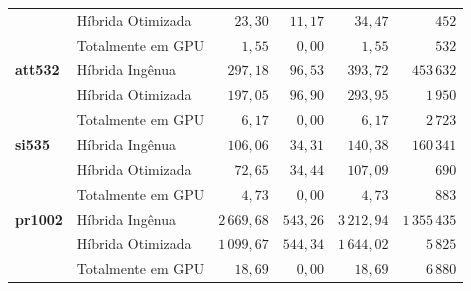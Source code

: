 \begin{table}[htbp]
\begin{tabeladensa}
\begin{tabular}{@{}llrrrr@{}}
                        & Híbrida Otimizada & \(23{,}30\)        & \(11{,}17\)        & \(34{,}47\)     & \(452\)         \\
                        & Totalmente em GPU & \(1{,}55\)         & \(0{,}00\)         & \(1{,}55\)      & \(532\)         \\
      \midrule
      \textbf{att532}   & Híbrida Ingênua   & \(297{,}18\)       & \(96{,}53\)        & \(393{,}72\)    & \(453\,632\)    \\
                        & Híbrida Otimizada & \(197{,}05\)       & \(96{,}90\)        & \(293{,}95\)    & \(1\,950\)      \\
                        & Totalmente em GPU & \(6{,}17\)         & \(0{,}00\)         & \(6{,}17\)      & \(2\,723\)      \\
      \midrule
      \textbf{si535}    & Híbrida Ingênua   & \(106{,}06\)       & \(34{,}31\)        & \(140{,}38\)    & \(160\,341\)    \\
                        & Híbrida Otimizada & \(72{,}65\)        & \(34{,}44\)        & \(107{,}09\)    & \(690\)         \\
                        & Totalmente em GPU & \(4{,}73\)         & \(0{,}00\)         & \(4{,}73\)      & \(883\)         \\
      \midrule
      \textbf{pr1002}   & Híbrida Ingênua   & \(2\,669{,}68\)    & \(543{,}26\)       & \(3\,212{,}94\) & \(1\,355\,435\) \\
                        & Híbrida Otimizada & \(1\,099{,}67\)    & \(544{,}34\)       & \(1\,644{,}02\) & \(5\,825\)      \\
                        & Totalmente em GPU & \(18{,}69\)        & \(0{,}00\)         & \(18{,}69\)     & \(6\,880\)      \\
      \bottomrule
    \end{tabular}
  \end{tabeladensa}
\end{table}

